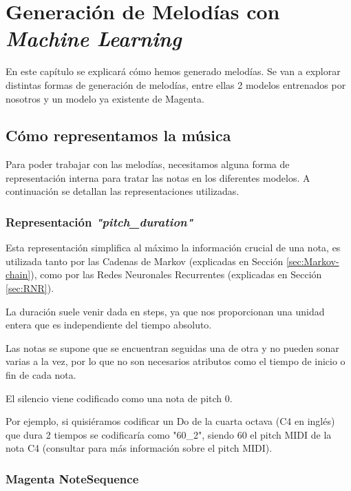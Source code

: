 \chapter{Generación de Melodías con \textit{Machine Learning}}
\label{cap:generacionMusical}

En este capítulo se explicará cómo hemos generado melodías. Se van a explorar distintas formas de generación de melodías, entre ellas 2 modelos entrenados por nosotros y un modelo ya existente de Magenta. 

\section{Cómo representamos la música}
Para poder trabajar con las melodías, necesitamos alguna forma de representación interna para tratar las notas en los diferentes modelos. A continuación se detallan las representaciones utilizadas.

\label{sec:como-generamos-melodias}
    \subsection{Representación \textit{"pitch\_duration"}}
    \label{sub:representacion-pitch_duracion}
    Esta representación simplifica al máximo la información crucial de una nota, es utilizada tanto por las Cadenas de Markov (explicadas en Sección \ref{sec:Markov-chain}), como por las Redes Neuronales Recurrentes (explicadas en Sección \ref{sec:RNR}).

    La duración suele venir dada en steps, ya que nos proporcionan una unidad entera que es independiente del tiempo absoluto.

    Las notas se supone que se encuentran seguidas una de otra y no pueden sonar varias a la vez, por lo que no son necesarios atributos como el tiempo de inicio o fin de cada nota.

    El silencio viene codificado como una nota de pitch 0.

    Por ejemplo, si quisiéramos codificar un Do de la cuarta octava (C4 en inglés) que dura 2 tiempos se codificaría como "60\_2", siendo 60 el pitch MIDI de la nota C4 (consultar \cite{MIDIPitch} para más información sobre el pitch MIDI).

    \subsection{Magenta NoteSequence}
    \label{subsec:note-seq}
    
